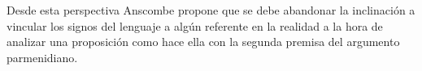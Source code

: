 Desde esta perspectiva Anscombe propone que se debe abandonar la inclinación a vincular los signos del lenguaje a algún referente en la realidad a la hora de analizar una proposición como hace ella con la segunda premisa del argumento parmenidiano.

